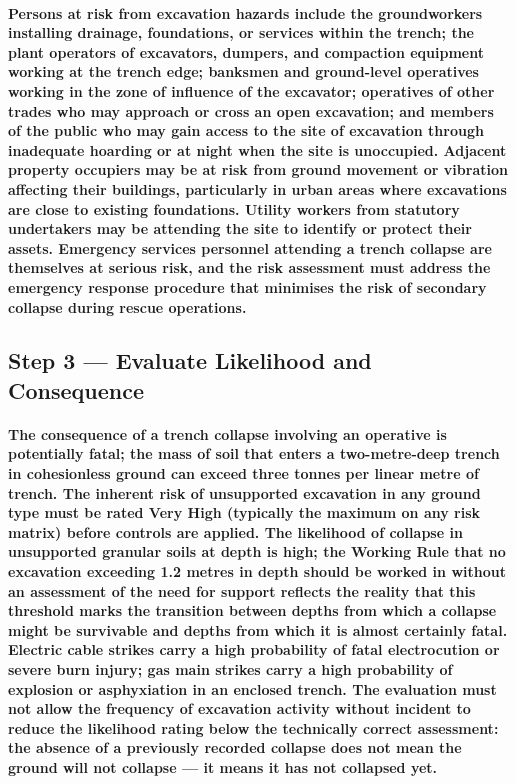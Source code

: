 \paragraph{Persons at risk from excavation hazards include the groundworkers installing drainage, foundations, or services within the trench; the plant operators of excavators, dumpers, and compaction equipment working at the trench edge; banksmen and ground-level operatives working in the zone of influence of the excavator; operatives of other trades who may approach or cross an open excavation; and members of the public who may gain access to the site of excavation through inadequate hoarding or at night when the site is unoccupied. Adjacent property occupiers may be at risk from ground movement or vibration affecting their buildings, particularly in urban areas where excavations are close to existing foundations. Utility workers from statutory undertakers may be attending the site to identify or protect their assets. Emergency services personnel attending a trench collapse are themselves at serious risk, and the risk assessment must address the emergency response procedure that minimises the risk of secondary collapse during rescue operations.}

\subsection{Step 3 --- Evaluate Likelihood and Consequence}
\paragraph{The consequence of a trench collapse involving an operative is potentially fatal; the mass of soil that enters a two-metre-deep trench in cohesionless ground can exceed three tonnes per linear metre of trench. The inherent risk of unsupported excavation in any ground type must be rated Very High (typically the maximum on any risk matrix) before controls are applied. The likelihood of collapse in unsupported granular soils at depth is high; the Working Rule that no excavation exceeding 1.2 metres in depth should be worked in without an assessment of the need for support reflects the reality that this threshold marks the transition between depths from which a collapse might be survivable and depths from which it is almost certainly fatal. Electric cable strikes carry a high probability of fatal electrocution or severe burn injury; gas main strikes carry a high probability of explosion or asphyxiation in an enclosed trench. The evaluation must not allow the frequency of excavation activity without incident to reduce the likelihood rating below the technically correct assessment: the absence of a previously recorded collapse does not mean the ground will not collapse --- it means it has not collapsed yet.}

